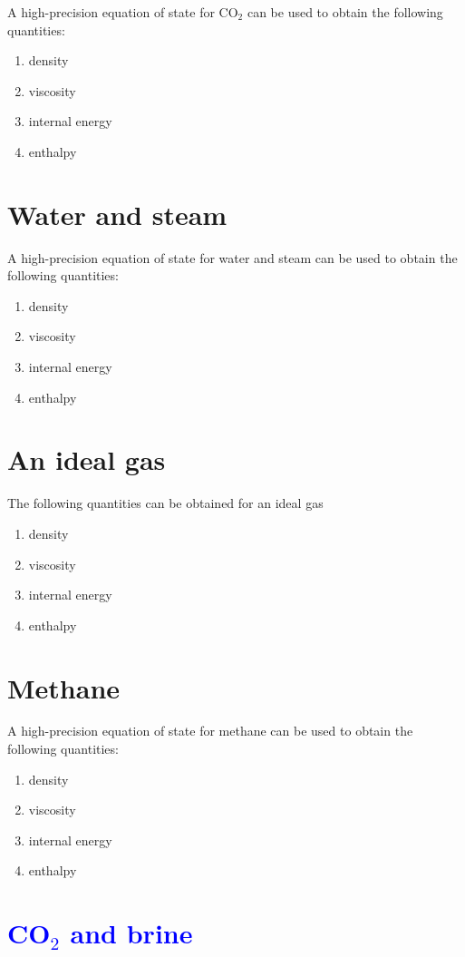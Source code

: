 \documentclass[12pt]{report}
\begin{document}
A high-precision equation of state for CO$_{2}$ can be used to
obtain the following quantities:
\begin{enumerate}
\item density
\item viscosity
\item internal energy
\item enthalpy
\end{enumerate}

\section{Water and steam}
\label{water.and.steam.sec}
A high-precision equation of state for water and steam can be used to
obtain the following quantities:
\begin{enumerate}
\item density
\item viscosity
\item internal energy
\item enthalpy
\end{enumerate}

\section{An ideal gas}

The following quantities can be obtained for an ideal gas
\begin{enumerate}
\item density
\item viscosity
\item internal energy
\item enthalpy
\end{enumerate}

\section{Methane}

A high-precision equation of state for methane can be used to
obtain the following quantities:
\begin{enumerate}
\item density
\item viscosity
\item internal energy
\item enthalpy
\end{enumerate}

\section{\textcolor{blue}{CO$_{2}$ and brine}}
\end{document}
